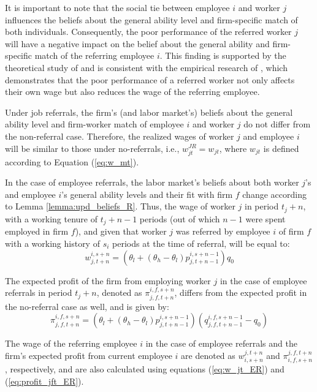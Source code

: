 \documentclass[12pt]{article}
\begin{document}
It is important to note that the social tie between employee $i$ and worker $j$ influences the beliefs about the general ability level and firm-specific match of both individuals. Consequently, the poor performance of the referred worker $j$ will have a negative impact on the belief about the general ability and firm-specific match of the referring employee $i$. This finding is supported by the theoretical study of \cite{ekinci2016employee} and is consistent with the empirical research of \cite{heath2018firms}, which demonstrates that the poor performance of a referred worker not only affects their own wage but also reduces the wage of the referring employee.

Under job referrals, the firm's (and labor market's) beliefs about the general ability level and firm-worker match of employee $i$ and worker $j$ do not differ from the non-referral case. Therefore, the realized wages of worker $j$ and employee $i$ will be similar to those under no-referrals, i.e., $w_{jt}^{JR} = w_{jt}$, where $w_{jt}$ is defined according to Equation (\ref{eq:w_mt}).

In the case of employee referrals, the labor market's beliefs about both worker $j$'s and employee $i$'s general ability levels and their fit with firm $f$ change according to Lemma \ref{lemma:upd_beliefs_R}. Thus, the wage of worker $j$ in period $t_j+n$, with a working tenure of $t_j+n-1$ periods (out of which $n-1$ were spent employed in firm $f$), and given that worker $j$ was referred by employee $i$ of firm $f$ with a working history of $s_i$ periods at the time of referral, will be equal to:
\begin{equation}\label{eq:w_jt_ER}
    w_{j,t+n}^{i,s+n} = \left(\theta_l + (\theta_h - \theta_l)p_{j,t+n-1}^{i,s+n-1}\right)q_{0}
\end{equation}

The expected profit of the firm from employing worker $j$ in the case of employee referrals in period $t_j+n$, denoted as $\pi_{j,f,t+n}^{i,f,s+n}$, differs from the expected profit in the no-referral case as well, and is given by:
\begin{equation}\label{eq:profit_jft_ER}
    \pi_{j,f,t+n}^{i,f,s+n} = \left(\theta_l + (\theta_h - \theta_l)p_{j,t+n-1}^{i,s+n-1}\right)\left( q_{j,f,t+n-1}^{i,f,s+n-1} - q_{0}\right)
\end{equation}

The wage of the referring employee $i$ in the case of employee referrals and the firm's expected profit from current employee $i$ are denoted as $w_{i,s+n}^{j,t+n}$ and $\pi_{i,f,s+n}^{j,f,t+n}$, respectively, and are also calculated using equations (\ref{eq:w_jt_ER}) and (\ref{eq:profit_jft_ER}).
\end{document}

